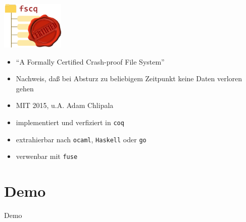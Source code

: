 \documentclass[aspectratio=169]{beamer}
\begin{document}
\begin{frame}
  \begin{center}
    \includegraphics[width=3.0cm]{fscq_logo.png}
  \end{center}
  \begin{itemize}
  \item ``A Formally Certified Crash-proof File System''
  \item Nachweis, daß bei Absturz zu beliebigem Zeitpunkt keine Daten verloren gehen
  \item MIT 2015, u.A. Adam Chlipala
  \item implementiert und verfiziert in \texttt{coq}
  \item extrahierbar nach \texttt{ocaml}, \texttt{Haskell} oder \texttt{go}
  \item verwenbar mit \texttt{fuse} 
  \end{itemize}
\end{frame}
\section{Demo}
\begin{frame}
  \begin{center}
    \huge{Demo}
  \end{center}
\end{frame}
\end{document}
